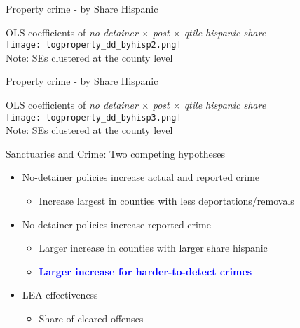 \documentclass[xcolor=pdftex,dvipsnames,table,handout]{beamer}
\begin{document}
\begin{frame}{Property crime - by Share Hispanic}
\footnotesize
\begin{center}
OLS coefficients of \textit{no detainer $\times$ post $\times$ qtile hispanic share}\\
\texttt{[image: logproperty\_dd\_byhisp2.png]}\\
\footnotesize{Note: SEs clustered at the county level}
\end{center}
\end{frame}

\begin{frame}{Property crime - by Share Hispanic}
\footnotesize
\begin{center}
OLS coefficients of \textit{no detainer $\times$ post $\times$ qtile hispanic share}\\
\texttt{[image: logproperty\_dd\_byhisp3.png]}\\
\footnotesize{Note: SEs clustered at the county level}
\end{center}
\end{frame}

\begin{frame}{Sanctuaries and Crime: Two competing hypotheses}
\begin{itemize}
\item No-detainer policies increase actual and reported crime\vspace{0.10cm}
\begin{itemize}
\item Increase largest in counties with less deportations/removals
\end{itemize}\vspace{0.30cm}
\item No-detainer policies increase reported crime\vspace{0.10cm}
\begin{itemize}
\item Larger increase in counties with larger share hispanic\vspace{0.10cm}
\item \textbf{\textcolor{Blue}{Larger increase for harder-to-detect crimes}}
\end{itemize}\vspace{0.30cm}
\item LEA effectiveness\vspace{0.10cm}
\begin{itemize}
\item Share of cleared offenses
\end{itemize}
\end{itemize}
\end{frame}
\end{document}
